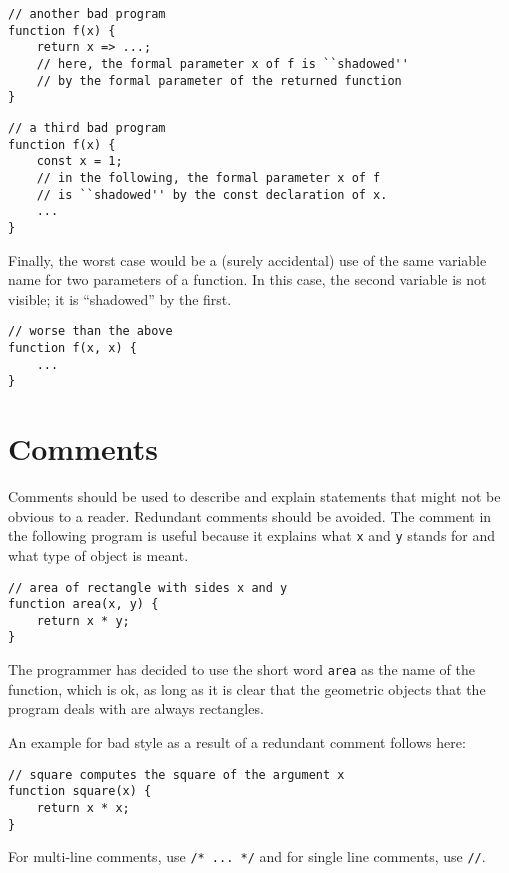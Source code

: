 \begin{lstlisting}
// another bad program
function f(x) {
    return x => ...;
    // here, the formal parameter x of f is ``shadowed'' 
    // by the formal parameter of the returned function
}
\end{lstlisting}

\begin{lstlisting}
// a third bad program
function f(x) {
    const x = 1;
    // in the following, the formal parameter x of f
    // is ``shadowed'' by the const declaration of x.
    ...
}
\end{lstlisting}
Finally, the worst case would be a (surely accidental) 
use of the same variable name for two parameters of a function.
In this case, the second variable is not visible; it is ``shadowed''
by the first.
\begin{lstlisting}
// worse than the above
function f(x, x) {
    ...
}
\end{lstlisting}

\section*{Comments}
Comments should be used to describe and explain statements 
that might not be obvious to a reader.
Redundant comments should be avoided. The comment in the following program is useful
because it explains what \lstinline{x} and \lstinline{y} stands for and what type of
object is meant. 
\begin{lstlisting}
// area of rectangle with sides x and y
function area(x, y) {
    return x * y;
}
\end{lstlisting}
The programmer has decided to use the short word \lstinline{area} as the name of the function,
which is ok, as long as it is clear that the geometric objects that the program deals with
are always rectangles.

An example for bad style as a result of a redundant comment follows here:
\begin{lstlisting}
// square computes the square of the argument x
function square(x) {
    return x * x;
}
\end{lstlisting}
%
For multi-line comments, use \lstinline{/* ... */} and for single line comments, use \lstinline{//}.



      
